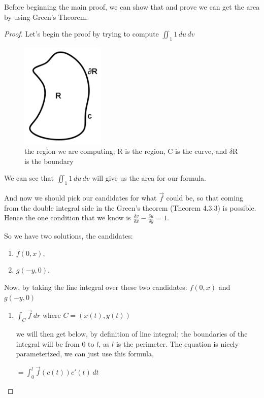 \documentclass[a4paper]{book}
\numberwithin{theorem}{section}%
\begin{document}
Before beginning the main proof, we can show that and prove we can get the area by using Green's Theorem.
\begin{proof}
	Let's begin the proof by trying to compute $\displaystyle \iint_{1} 1 \,du\,dv$
	\begin{figure}[hbt!]
        \begin{center}   
            \includegraphics[width=40mm]{Schmidt3}
            \caption{the region we are computing; R is the region, C is the curve, and $\delta\mathrm{R}$ is the boundary}
        \end{center}
    \end{figure}\leavevmode
    \newline
    We can see that $\displaystyle \iint_{1} 1 \,du\,dv$ will give us the area for our formula.

	And now we should pick our candidates for what $\overrightarrow{f}$ could be, so that coming from the double integral side in the Green's theorem (Theorem 4.3.3) is possible. Hence the one condition that we know is $\displaystyle \frac{\delta v}{\delta x}-\frac{\delta u}{\delta y}=1$.
	
	So we have two solutions, the candidates:
	\begin{enumerate}
		\item $f(0,x)$,
		\item $g(-y,0)$.
	\end{enumerate}
	
	Now, by taking the line integral over these two candidates: $f(0,x)$ and $g(-y,0)$
	\begin{enumerate}
		\item
			$\int_{C} \overrightarrow{f} \,dr$ \;\;\;where\; $C=(x(t),y(t))$

            we will then get below, by definition of line integral; the boundaries of the integral will be from $0$ to $l$, as $l$ is the perimeter. The equation is nicely parameterized, we can just use this formula,
            \begin{center}
                $\displaystyle =\int_{0}^{l} \overrightarrow{f}(c(t))c'(t) \,dt$
            \end{center}


\end{enumerate}
\end{proof}
\end{document}

